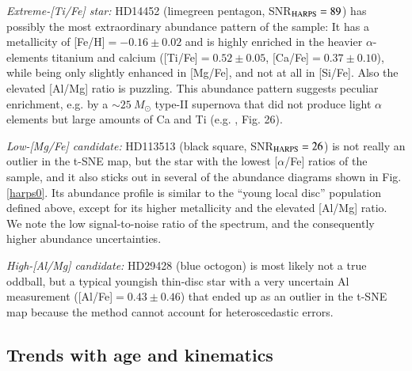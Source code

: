 \documentclass{aa}  %
\begin{document}
{\it Extreme-[Ti/Fe] star:} HD14452 (limegreen pentagon, SNR$_{\rm HARPS}=89$) has possibly the most extraordinary abundance pattern of the \citet{DelgadoMena2017} sample: It has a metallicity of [Fe/H]$=-0.16\pm0.02$ and is highly enriched in the heavier $\alpha$-elements titanium and calcium ([Ti/Fe]$=0.52\pm0.05$, [Ca/Fe]$=0.37\pm0.10$), while being only slightly enhanced in [Mg/Fe], and not at all in [Si/Fe]. Also the elevated [Al/Mg] ratio is puzzling. This abundance pattern suggests peculiar enrichment, e.g. by a $\sim25\ M_{\odot}$ type-II supernova that did not produce light $\alpha$ elements but large amounts of Ca and Ti (e.g. \citealt{Ritter2017a}, Fig. 26).

{\it Low-[Mg/Fe] candidate:} HD113513 (black square, SNR$_{\rm HARPS}=26$) is not really an outlier in the t-SNE map, but the star with the lowest [$\alpha$/Fe] ratios of the sample, and it also sticks out in several of the abundance diagrams shown in Fig. \ref{harps0}. Its abundance profile is similar to the ``young local disc'' population defined above, except for its higher metallicity and the elevated [Al/Mg] ratio. We note the low signal-to-noise ratio of the spectrum, and the consequently higher abundance uncertainties.%

{\it High-[Al/Mg] candidate:} HD29428 (blue octogon) is most likely not a true oddball, but a typical youngish thin-disc star with a very uncertain Al measurement ([Al/Fe]$=0.43\pm0.46$) that ended up as an outlier in the t-SNE map because the method cannot account for heteroscedastic errors.

\subsection{Trends with age and kinematics}
\end{document}

